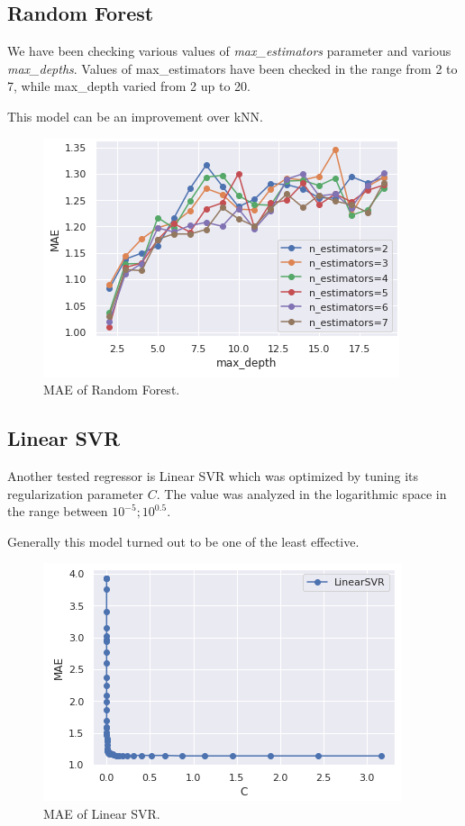 \documentclass[sigconf]{acmart}
\begin{document}
\subsection{Random Forest}
We have been checking various values of \emph{max\_estimators} parameter and various \emph{max\_depths}. 
Values of max\_estimators have been checked in the range from 2 to 7, while max\_depth varied from 2 up to 20.

This model can be an improvement over kNN.

\begin{figure}[h]
    \includegraphics[width=\linewidth]{3-random-forest.png}
    \centering
    \caption{MAE of Random Forest.}
\end{figure}

\subsection{Linear SVR}
Another tested regressor is Linear SVR which was optimized by tuning its regularization parameter $C$. The value was analyzed in the logarithmic space in the range between $10^{-5} ; 10^{0.5}$.

Generally this model turned out to be one of the least effective.

\begin{figure}[h]
    \includegraphics[width=\linewidth]{4-linear-svr.png}
    \centering
    \caption{MAE of Linear SVR.}
\end{figure}
\end{document}
